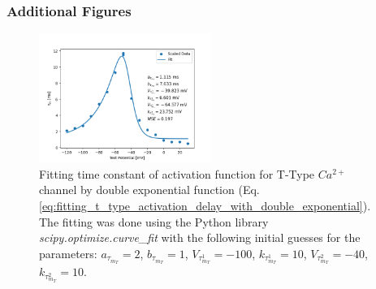 \documentclass[../../workflow.tex]{subfiles}
\begin{document}
\subsubsection{Additional Figures}
\begin{figure}[H]
    \centering
    \includegraphics[width=0.5\textwidth, page=1]{./img/t_type_calcium_channel/activation_fit_by_double_exponentials.png}
    \caption{
        Fitting time constant of activation function for T-Type $Ca^{2+}$ channel by double exponential function
        (Eq. \ref{eq:fitting_t_type_activation_delay_with_double_exponential}). The fitting was done using the Python
        library \textit{scipy.optimize.curve\_fit} with the following initial guesses for the parameters:
        $a_{\tau_{m_T}}=2$, $b_{\tau_{m_T}}=1$, $V_{\tau_{m_T}^1}=-100$, $k_{\tau_{m_T}^1}=10$,
        $V_{\tau_{m_T}^2}=-40$, $k_{\tau_{m_T}^2}=10$.
    }
\end{figure}
\end{document}
